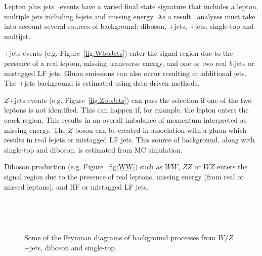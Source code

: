 Lepton plus jets \ttbar\ events have a varied final state signature that includes a lepton, multiple jets including $b$-jets and missing energy. As a result \ttbar\ analyses must take into account several sources of background: diboson, \W+jets, \Z+jets, single-top and multijet.

\W+jets events (e.g. Figure~\ref{fig:WbbJets}) enter the signal region due to the presence of a real lepton, missing transverse energy, and one or two real $b$-jets or mistagged LF jets. Gluon emissions can also occur resulting in additional jets. The \W+jets background is estimated using data-driven methods.

$Z$+jets events (e.g. Figure~\ref{fig:ZbbJets}) can pass the selection if one of the two leptons is not identified. This can happen if, for example, the lepton enters the crack region. This results in an overall imbalance of momentum interpreted as missing energy. The $Z$ boson can be created in association with a gluon which results in real $b$-jets or mistagged LF jets. This source of background, along with single-top and diboson, is estimated from MC simulation.

Diboson production (e.g. Figure~\ref{fig:WW}) such as $WW$, $ZZ$ or $WZ$ enters the signal region due to the presence of real leptons, missing energy (from real or missed leptons), and HF or mistagged LF jets.

\begin{figure}[htbp]
  \centering
    \begin{minipage}[][][t]{.45\textwidth}
      \centering
        
        \label{fig:WbbJets}
    \end{minipage}
    \,
    \begin{minipage}[][][t]{.45\textwidth}
      \centering
        
        \label{fig:ZbbJets}
    \end{minipage}
    
    \begin{minipage}[][][t]{.45\textwidth}
      \centering
        
        \label{fig:WW}
    \end{minipage}
    \,
    \begin{minipage}[][][t]{.45\textwidth}
      \centering
        
        \label{fig:SingleTop}
    \end{minipage}
    \caption{Some of the Feynman diagrams of background processes from $W/Z$+jets, diboson and single-top.}\label{fig:CrossSectionWJetsFeynman}
\end{figure}

